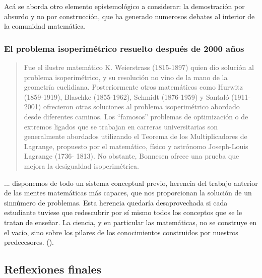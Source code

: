 Acá se aborda otro elemento epistemológico a considerar: la demostración por absurdo y no por construcción, que ha generado numerosos debates al interior de la comunidad matemática.

\subsubsection{El problema isoperimétrico resuelto después de 2000 años}

\begin{quote}
	Fue el ilustre matemático K. Weierstrass (1815-1897) quien dio solución al problema isoperimétrico, y su resolución no vino de la mano de la geometría euclidiana. Posteriormente otros matemáticos como Hurwitz (1859-1919), Blaschke (1855-1962), Schmidt (1876-1959) y Santaló (1911-2001) ofrecieron otras soluciones al problema isoperimétrico abordado desde diferentes caminos. Los “famosos” problemas de optimización o de extremos ligados que se trabajan en carreras universitarias son generalmente abordados utilizando el Teorema de los Multiplicadores de Lagrange, propuesto por el matemático, físico y astrónomo Joseph-Louis Lagrange (1736- 1813). No obstante, Bonnesen ofrece una prueba que mejora la desigualdad isoperimétrica.
\end{quote}
\vspace{1em}

... disponemos de todo un sistema conceptual previo, herencia del trabajo anterior de las mentes matemáticas más capaces, que nos proporcionan la solución de un sinnúmero de problemas. Esta herencia quedaría desaprovechada si cada estudiante tuviese que redescubrir por sí mismo todos los conceptos que se le tratan de enseñar. La ciencia, y en particular las matemáticas, no se construye en el vacío, sino sobre los pilares de los conocimientos construidos por nuestros predecesores. (\textcite{godino2003}).

\subsection{Reflexiones finales}

